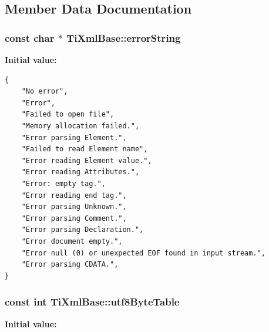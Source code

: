 \subsection{Member Data Documentation}
\subsubsection{\setlength{\rightskip}{0pt plus 5cm}const char $\ast$ Ti\-Xml\-Base::error\-String\hspace{0.3cm}{\tt  [static, protected, inherited]}}\label{classTiXmlBase_TiXmlUnknownt0}


{\bf Initial value:}

\footnotesize\begin{verbatim}
{
    "No error",
    "Error",
    "Failed to open file",
    "Memory allocation failed.",
    "Error parsing Element.",
    "Failed to read Element name",
    "Error reading Element value.",
    "Error reading Attributes.",
    "Error: empty tag.",
    "Error reading end tag.",
    "Error parsing Unknown.",
    "Error parsing Comment.",
    "Error parsing Declaration.",
    "Error document empty.",
    "Error null (0) or unexpected EOF found in input stream.",
    "Error parsing CDATA.",
}
\end{verbatim}\normalsize 
{}
\subsubsection{\setlength{\rightskip}{0pt plus 5cm}const int Ti\-Xml\-Base::utf8Byte\-Table\hspace{0.3cm}{\tt  [static, inherited]}}\label{classTiXmlBase_TiXmlUnknowns0}


{\bf Initial value:}

